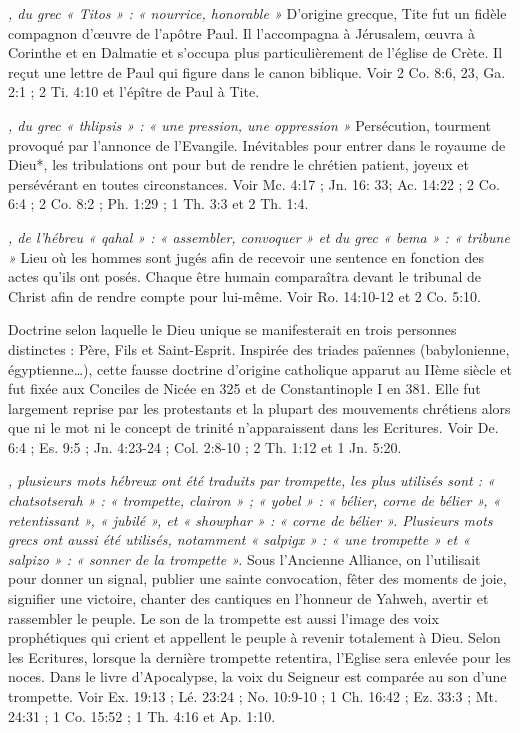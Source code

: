 \begin{multicols}{2}
\textit{, du grec « Titos » : « nourrice, honorable »}\newline
D'origine grecque, Tite fut un fidèle compagnon d'œuvre de l'apôtre Paul. Il l'accompagna à Jérusalem, œuvra à Corinthe et en Dalmatie et s'occupa plus particulièrement de l'église de Crète. Il reçut une lettre de Paul qui figure dans le canon biblique. Voir 2 Co. 8:6, 23, Ga. 2:1 ; 2 Ti. 4:10 et l'épître de Paul à Tite.

\textit{, du grec « thlipsis » : « une pression, une oppression »}\newline
Persécution, tourment provoqué par l'annonce de l'Evangile. Inévitables pour entrer dans le royaume de Dieu*, les tribulations ont pour but de rendre le chrétien patient, joyeux et persévérant en toutes circonstances. Voir Mc. 4:17 ; Jn. 16: 33; Ac. 14:22 ; 2 Co. 6:4 ; 2 Co. 8:2 ; Ph. 1:29 ; 1 Th. 3:3 et 2 Th. 1:4.

\textit{, de l'hébreu « qahal » : « assembler, convoquer » et du grec « bema » : « tribune »}\newline
Lieu où les hommes sont jugés afin de recevoir une sentence en fonction des actes qu'ils ont posés. Chaque être humain comparaîtra devant le tribunal de Christ afin de rendre compte pour lui-même. Voir Ro. 14:10-12 et 2 Co. 5:10.

\textit{}\newline
Doctrine selon laquelle le Dieu unique se manifesterait en trois personnes distinctes : Père, Fils et Saint-Esprit. Inspirée des triades païennes (babylonienne, égyptienne…), cette fausse doctrine d'origine catholique apparut au IIème siècle et fut fixée aux Conciles de Nicée en 325 et de Constantinople I en 381. Elle fut largement reprise par les protestants et la plupart des mouvements chrétiens alors que ni le mot ni le concept de trinité n'apparaissent dans les Ecritures. Voir De. 6:4 ; Es. 9:5 ; Jn. 4:23-24 ; Col. 2:8-10 ; 2 Th. 1:12 et 1 Jn. 5:20.

\textit{, plusieurs mots hébreux ont été traduits par trompette, les plus utilisés sont : « chatsotserah » : « trompette, clairon » ; « yobel » : « bélier, corne de bélier », « retentissant », « jubilé », et « showphar » : « corne de bélier ». Plusieurs mots grecs ont aussi été utilisés, notamment « salpigx » : « une trompette » et « salpizo » : « sonner de la trompette ».}\newline
Sous l'Ancienne Alliance, on l'utilisait pour donner un signal, publier une sainte convocation, fêter des moments de joie, signifier une victoire, chanter des cantiques en l'honneur de Yahweh, avertir et rassembler le peuple. Le son de la trompette est aussi l'image des voix prophétiques qui crient et appellent le peuple à revenir totalement à Dieu. Selon les Ecritures, lorsque la dernière trompette retentira, l'Eglise sera enlevée pour les noces. Dans le livre d'Apocalypse, la voix du Seigneur est comparée au son d'une trompette. Voir Ex. 19:13 ; Lé. 23:24 ; No. 10:9-10 ; 1 Ch. 16:42 ; Ez. 33:3 ; Mt. 24:31 ; 1 Co. 15:52 ; 1 Th. 4:16 et Ap. 1:10.


\end{multicols}
